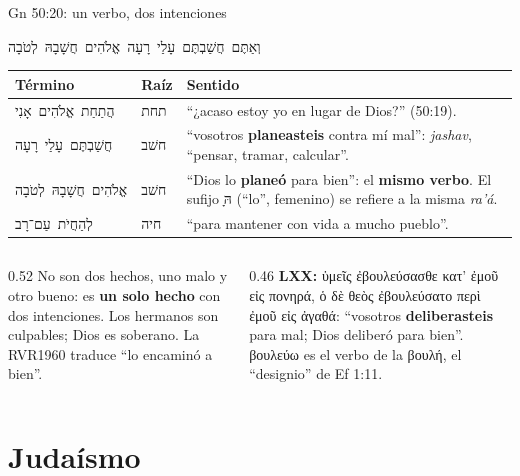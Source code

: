\documentclass[hyperref={bookmarks=false},aspectratio=169]{beamer}
\newcommand{\heb}[1]{\mbox{\foreignlanguage{hebrew}{#1}}}
\newcommand{\grc}[1]{\foreignlanguage{ancientgreek}{#1}}
\newcommand{\destacar}[1]{\textbf{\textcolor{azul}{#1}}}
\begin{document}
\begin{frame}{Gn 50:20: un verbo, dos intenciones}
\begin{center}\large\heb{וְאַתֶּם חֲשַׁבְתֶּם עָלַי רָעָה אֱלֹהִים חֲשָׁבָהּ לְטֹבָה}\end{center}
\scriptsize\renewcommand{\arraystretch}{1.15}
\begin{tabular}{@{}>{\RaggedRight\arraybackslash}p{3.0cm}>{\RaggedRight\arraybackslash}p{1.1cm}>{\RaggedRight\arraybackslash}p{7.7cm}@{}}
\toprule
\textbf{Término} & \textbf{Raíz} & \textbf{Sentido} \\ \midrule
\heb{הֲתַחַת אֱלֹהִים אָנִי} & \heb{תחת} & ``¿acaso estoy yo en lugar de Dios?'' (50:19). \\
\heb{חֲשַׁבְתֶּם עָלַי רָעָה} & \heb{חשׁב} & ``vosotros \destacar{planeasteis} contra mí mal'': \emph{jashav}, ``pensar, tramar, calcular''. \\
\heb{אֱלֹהִים חֲשָׁבָהּ לְטֹבָה} & \heb{חשׁב} & ``Dios lo \destacar{planeó} para bien'': el \destacar{mismo verbo}. El sufijo \heb{ָהּ} (``lo'', femenino) se refiere a la misma \emph{ra'á}. \\
\heb{לְהַחֲיֹת עַם־רָב} & \heb{חיה} & ``para mantener con vida a mucho pueblo''. \\
\bottomrule
\end{tabular}\par\medskip
\begin{columns}[t,onlytextwidth]
\begin{column}{0.52\textwidth}\small
No son dos hechos, uno malo y otro bueno: es \destacar{un solo hecho} con dos intenciones. Los hermanos son culpables; Dios es soberano. La RVR1960 traduce ``lo encaminó a bien''.
\end{column}
\begin{column}{0.46\textwidth}\scriptsize
\textbf{LXX:} \grc{ὑμεῖς ἐβουλεύσασθε κατ’ ἐμοῦ εἰς πονηρά, ὁ δὲ θεὸς ἐβουλεύσατο περὶ ἐμοῦ εἰς ἀγαθά}: ``vosotros \destacar{deliberasteis} para mal; Dios deliberó para bien''. \grc{βουλεύω} es el verbo de la \grc{βουλή}, el ``designio'' de Ef 1:11.
\end{column}
\end{columns}
\end{frame}

\section{Judaísmo}
\end{document}
